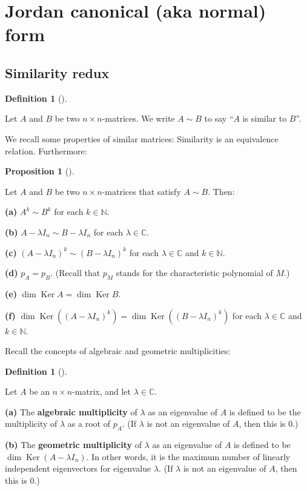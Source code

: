 \documentclass[numbers=enddot,12pt,final,onecolumn,notitlepage]{scrartcl}%
\numberwithin{exer}{subsection}
\theoremstyle{definition}
\newtheorem{prop}[theo]{Proposition}
\newenvironment{proposition}[1][]
{\begin{prop}[#1]\begin{leftbar}}
{\end{leftbar}\end{prop}}
\newtheorem{defi}[theo]{Definition}
\newenvironment{definition}[1][]
{\begin{defi}[#1]\begin{leftbar}}
{\end{leftbar}\end{defi}}
\begin{document}
\section{Jordan canonical (aka normal) form}

\subsection{Similarity redux}

\begin{definition}
Let $A$ and $B$ be two $n\times n$-matrices. We write $A\sim B$ to say
\textquotedblleft$A$ is similar to $B$\textquotedblright.
\end{definition}

We recall some properties of similar matrices: Similarity is an equivalence
relation. Furthermore:

\begin{proposition}
Let $A$ and $B$ be two $n\times n$-matrices that satisfy $A\sim B$. Then:

\textbf{(a)} $A^{k}\sim B^{k}$ for each $k\in\mathbb{N}$.

\textbf{(b)} $A-\lambda I_{n}\sim B-\lambda I_{n}$ for each $\lambda
\in\mathbb{C}$.

\textbf{(c)} $\left(  A-\lambda I_{n}\right)  ^{k}\sim\left(  B-\lambda
I_{n}\right)  ^{k}$ for each $\lambda\in\mathbb{C}$ and $k\in\mathbb{N}$.

\textbf{(d)} $p_{A}=p_{B}$. (Recall that $p_{M}$ stands for the characteristic
polynomial of $M$.)

\textbf{(e)} $\dim\operatorname*{Ker}A=\dim\operatorname*{Ker}B$.

\textbf{(f)} $\dim\operatorname*{Ker}\left(  \left(  A-\lambda I_{n}\right)
^{k}\right)  =\dim\operatorname*{Ker}\left(  \left(  B-\lambda I_{n}\right)
^{k}\right)  $ for each $\lambda\in\mathbb{C}$ and $k\in\mathbb{N}$.
\end{proposition}

Recall the concepts of algebraic and geometric multiplicities:

\begin{definition}
Let $A$ be an $n\times n$-matrix, and let $\lambda\in\mathbb{C}$.

\textbf{(a)} The \textbf{algebraic multiplicity} of $\lambda$ as an eigenvalue
of $A$ is defined to be the multiplicity of $\lambda$ as a root of $p_{A}$.
(If $\lambda$ is not an eigenvalue of $A$, then this is $0$.)

\textbf{(b)} The \textbf{geometric multiplicity} of $\lambda$ as an eigenvalue
of $A$ is defined to be $\dim\operatorname*{Ker}\left(  A-\lambda
I_{n}\right)  $. In other words, it is the maximum number of linearly
independent eigenvectors for eigenvalue $\lambda$. (If $\lambda$ is not an
eigenvalue of $A$, then this is $0$.)
\end{definition}
\end{document}
